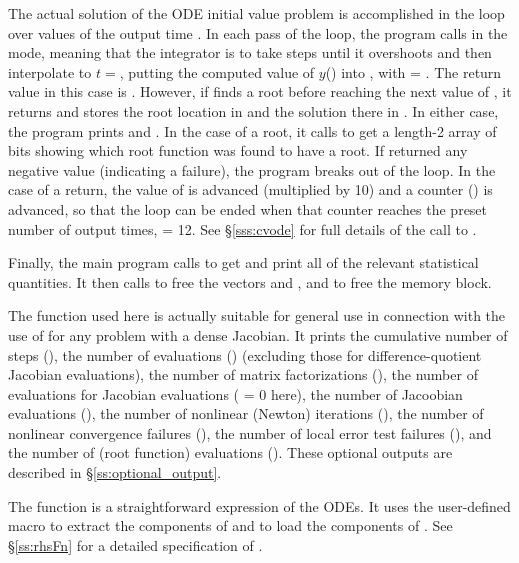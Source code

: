 The actual solution of the ODE initial value problem is accomplished in
the loop over values of the output time .  In each pass of the
loop, the program calls  in the  mode, meaning that
the integrator is to take steps until it overshoots  and then
interpolate to $t = $, putting the computed value of $y$()
into , with  = .  The return value in this case is
.  However, if  finds a root before reaching the next
value of , it returns  and stores the root
location in  and the solution there in .  In either case, the
program prints  and .  In the case of a root, it calls
 to get a length-2 array  of bits showing
which root function was found to have a root.  If  returned any
negative value (indicating a failure), the program breaks out of the loop.  
In the case of a  return, the value of  is
advanced (multiplied by 10) and a counter () is advanced, so
that the loop can be ended when that counter reaches the preset number
of output times,  = 12.  See \S\ref{sss:cvode} for full
details of the call to .

Finally, the main program calls  to get and print
all of the relevant statistical quantities.  It then calls 
to free the vectors  and , and  to free the 
{\cvode} memory block.

The function  used here is actually suitable for
general use in connection with the use of {\cvode} for any problem with 
a dense Jacobian.  It prints the cumulative number of steps (), 
the number of  evaluations () (excluding those for
difference-quotient Jacobian evaluations),
the number of matrix factorizations (),
the number of  evaluations for Jacobian evaluations (
= 0 here),
the number of Jacoobian evaluations (),
the number of nonlinear (Newton) iterations (),
the number of nonlinear convergence failures (),
the number of local error test failures (), and
the number of  (root function) evaluations ().
These optional outputs are described in \S\ref{ss:optional_output}.

The function  is a straightforward expression of the ODEs. 
It uses the user-defined macro  to extract the components of 
and to load the components of .
See \S\ref{ss:rhsFn} for a detailed specification of .

